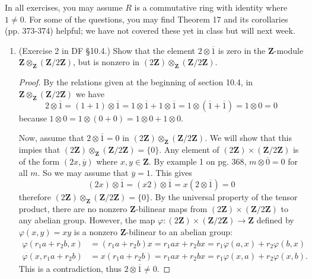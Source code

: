 \documentclass[10pt]{article}
\newcommand{\Z}{\mathbf{Z}}
\begin{document}
In all exercises, you may assume $R$ is a commutative ring with identity where $1 \neq 0$.  For some of the questions, you may find Theorem 17 and its corollaries (pp. 373-374) helpful; we have not covered these yet in class but will next week.

\begin{enumerate}

\item (Exercise 2 in DF \S 10.4.) Show that the element $2 \otimes \overline{1}$ is zero in the $\mathbf{Z}$-module $\mathbf{Z} \otimes_\mathbf{Z} (\mathbf{Z}/2\mathbf{Z})$, but is nonzero in $(2\mathbf{Z}) \otimes_\mathbf{Z} (\mathbf{Z}/2\mathbf{Z})$.

\begin{proof}
By the relations given at the beginning of section 10.4, in $\mathbf{Z} \otimes_\mathbf{Z} (\mathbf{Z}/2\mathbf{Z})$ we have $$2 \otimes \overline{1} = (1+1) \otimes \overline{1} = 1 \otimes \overline{1} + 1 \otimes \overline{1} = 1 \otimes (\overline{1} + \overline{1}) = 1 \otimes 0 = 0$$ because $1 \otimes 0 = 1 \otimes (0 + 0) = 1 \otimes 0 + 1 \otimes 0$.

Now, assume that $2 \otimes \overline{1} = 0$ in $(2\mathbf{Z}) \otimes_\mathbf{Z} (\mathbf{Z}/2\mathbf{Z})$.  We will show that this impies that $(2\mathbf{Z}) \otimes_\mathbf{Z} (\mathbf{Z}/2\mathbf{Z}) = \{0\}$.  Any element of $(2\mathbf{Z}) \times (\mathbf{Z}/2\mathbf{Z})$ is of the form $(2x,\overline{y})$ where $x,y \in \Z$.  By example 1 on pg. 368, $m \otimes \overline{0} = 0$ for all $m$.  So we may assume that $\overline{y} = 1$.  This gives
$$
(2x) \otimes \overline{1} = (x2) \otimes \overline{1} = x (2 \otimes \overline{1}) = 0
$$
therefore $(2\mathbf{Z}) \otimes_\mathbf{Z} (\mathbf{Z}/2\mathbf{Z}) = \{0\}$.  By the universal property of the tensor product, there are no nonzero $\Z$-bilinear maps from $(2\mathbf{Z}) \times (\mathbf{Z}/2\mathbf{Z})$ to any abelian group.  However, the map $\varphi: (2\mathbf{Z}) \times (\mathbf{Z}/2\mathbf{Z}) \rightarrow \Z$ defined by $\varphi(x,y) = xy$ is a nonzero $\Z$-bilinear to an abelian group:
\begin{align*}
\varphi(r_1a + r_2b,x) &= (r_1a+r_2b)x = r_1ax + r_2bx = r_1\varphi(a,x) + r_2\varphi(b,x)
\\
\varphi(x,r_1a + r_2b) &= x(r_1a + r_2b) = r_1ax + r_2bx = r_1\varphi(x,a) + r_2\varphi(x,b).
\end{align*}
This is a contradiction, thus $2 \otimes \overline{1} \neq 0$.
\end{proof}


\end{enumerate}
\end{document}
